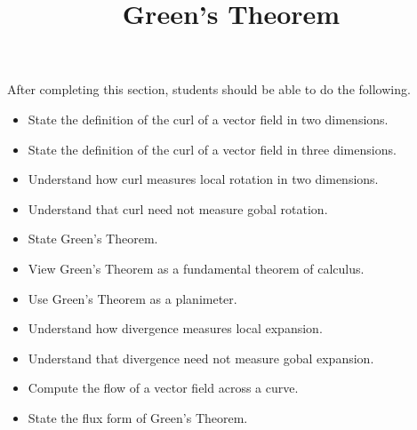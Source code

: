 \documentclass{ximera}
\title{Green's Theorem}
\begin{document}
\begin{abstract}
\end{abstract}
\maketitle

\begin{sectionOutcomes}

After completing this section, students should be able to do the following.

\begin{itemize}
\item State the definition of the curl of a vector field in two dimensions.
\item State the definition of the curl of a vector field in three dimensions.
\item Understand how curl measures local rotation in two dimensions.
\item Understand that curl need not measure gobal rotation.
\item State Green's Theorem.
\item View Green's Theorem as a fundamental theorem of calculus.
\item Use Green's Theorem as a planimeter.
\item Understand how divergence measures local expansion.
\item Understand that divergence need not measure gobal expansion.
\item Compute the flow of a vector field across a curve.
\item State the flux form of Green's Theorem.
\end{itemize}

\end{sectionOutcomes}
\end{document}
